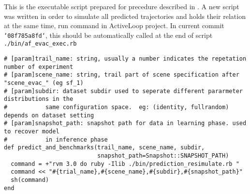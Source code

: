 This is the executable script prepared for precedure described in . A new script was 
written in order to simulate all predicted trajectories and holds their relation at the same time, run command in 
ActiveLoop project. In current commit \texttt{`08f785a8fd`}, this should be automatically called at the end of 
script \texttt{./bin/af_evac_exec.rb}

\begin{verbatim}
# [param]trail_name: string, usually a number indicates the repetation number of experiment
# [param]scene_name: string, trail part of scene specification after "scene_evac_" (eg sf_1)
# [param]subdir: dataset subdir used to seperate different pararmeter distributions in the
#           same configuration space.  eg: (identity, fullrandom) depends on dataset setting
# [param]snapshot_path: snapshot path for data in learning phase. used to recover model
#           in inference phase
def predict_and_benchmarks(trail_name, scene_name, subdir,
                           snapshot_path=Snapshot::SNAPSHOT_PATH)
  command = +"rvm 3.0 do ruby -Ilib ./bin/prediction_resimulate.rb "
  command << "#{trial_name},#{scene_name},#{subdir},#{snapshot_path}"
  sh(command)
end
\end{verbatim}

%
\printbibliography
